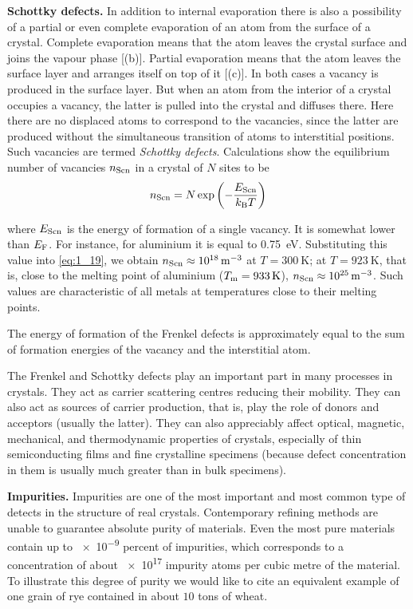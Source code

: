 \textbf{Schottky defects.} In addition to internal evaporation there is also a possibility of a partial or even complete evaporation of an atom from the surface of a crystal. Complete evaporation means that the atom leaves the crystal surface and joins the vapour phase [(b)]. Partial evaporation means that the atom leaves the surface layer and arranges itself on top of it [(c)]. In both cases a vacancy is produced in the surface layer. But when an atom from the interior of a crystal occupies a vacancy, the latter is pulled into the crystal and diffuses there. Here there are no displaced atoms to correspond to the vacancies, since the latter are produced without the simultaneous transition of atoms to interstitial positions. Such vacancies are termed \textit{Schottky defects}. Calculations show the equilibrium number of vacancies $n_{\text{Scn}}$ in a crystal of $N$ sites to be
\begin{equation}\label{eq:1_19}
	n_{\text{Scn}} = N \exp\left(-\frac{E_{\text{Scn}}}{k_{\text{B}}T}\right)
\end{equation}

\noindent
where $E_{\text{Scn}}$ is the energy of formation of a single vacancy. It is somewhat lower than $E_{\text{F}}$. For instance, for aluminium it is equal to \SI{0.75}{\electronvolt}. Substituting this value into \eqref{eq:1_19}, we obtain $n_{\text{Scn}}\approx\SI{e18}{\per\metre\cubed}$ at $T=\SI{300}{\kelvin}$; at $T=\SI{923}{\kelvin}$, that is, close to the melting point of aluminium ($T_{\text{m}}=\SI{933}{\kelvin}$), $n_{\text{Scn}}\approx\SI{e25}{\per\metre\cubed}$.
Such values are characteristic of all metals at temperatures close to their melting points.

The energy of formation of the Frenkel defects is approximately equal to the sum of formation energies of the vacancy and the interstitial atom.

The Frenkel and Schottky defects play an important part in many processes in crystals. They act as carrier scattering centres reducing their mobility. They can also act as sources of carrier production, that is, play the role of donors and acceptors (usually the latter). They can also appreciably affect optical, magnetic, mechanical, and thermodynamic properties of crystals, especially of thin semiconducting films and fine crystalline specimens (because defect concentration in them is usually much greater than in bulk specimens).

\textbf{Impurities.} Impurities are one of the most important and most common type of detects in the structure of real crystals. Contemporary refining methods are unable to guarantee absolute purity of materials. Even the most pure materials contain up to \num{e-9} percent of impurities, which corresponds to a concentration of about \num{e17} impurity atoms per cubic metre of the material. To illustrate this degree of purity we would like to cite an equivalent example of one grain of rye contained in about $10$ tons of wheat.


